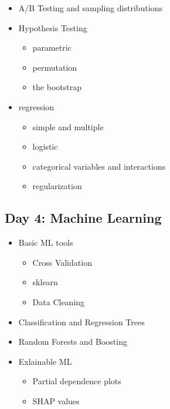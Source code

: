 \documentclass[
  letterpaper,
  DIV=11,
  numbers=noendperiod]{scrreprt}
\providecommand{\tightlist}{%
  \setlength{\itemsep}{0pt}\setlength{\parskip}{0pt}}\usepackage{longtable,booktabs,array}
\begin{document}
\begin{itemize}
\tightlist
\item
  A/B Testing and sampling distributions
\item
  Hypothesis Testing

  \begin{itemize}
  \tightlist
  \item
    parametric
  \item
    permutation
  \item
    the bootstrap
  \end{itemize}
\item
  regression

  \begin{itemize}
  \tightlist
  \item
    simple and multiple
  \item
    logistic
  \item
    categorical variables and interactions
  \item
    regularization
  \end{itemize}
\end{itemize}

\hypertarget{day-4-machine-learning}{%
\subsection*{Day 4: Machine Learning}\label{day-4-machine-learning}}

\begin{itemize}
\tightlist
\item
  Basic ML tools

  \begin{itemize}
  \tightlist
  \item
    Cross Validation
  \item
    sklearn
  \item
    Data Cleaning
  \end{itemize}
\item
  Classification and Regression Trees
\item
  Random Forests and Boosting
\item
  Exlainable ML

  \begin{itemize}
  \tightlist
  \item
    Partial dependence plots
  \item
    SHAP values
  \end{itemize}
\end{itemize}
\end{document}
